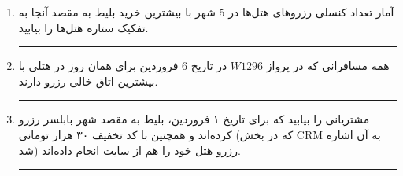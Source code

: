 \begin{enumerate}
	
	
	
	\item
	آمار تعداد کنسلی رزروهای هتل‌ها در 5 شهر با بیشترین خرید بلیط به مقصد آنجا به‌ تفکیک ستاره هتل‌ها را بیابید.
	
	
	\rule{\linewidth}{0.05mm}	 
	
	
	
	\item
	همه مسافرانی که در پرواز $W1296$ در تاریخ 6 فروردین برای همان روز در هتلی با بیشترین اتاق خالی رزرو دارند.
	
	
	\rule{\linewidth}{0.05mm}
	
	
	
	\item
	مشتریانی را بیابید که برای تاریخ ۱ فروردین، بلیط به مقصد شهر بابلسر رزرو کرده‌اند و همچنین \linebreak با کد تخفیف ۳۰ هزار تومانی (که در بخش CRM به‌ آن اشاره شد) رزرو هتل خود را هم از سایت انجام داده‌اند.
	
	
	\rule{\linewidth}{0.05mm}	 
	
	
	
\end{enumerate}